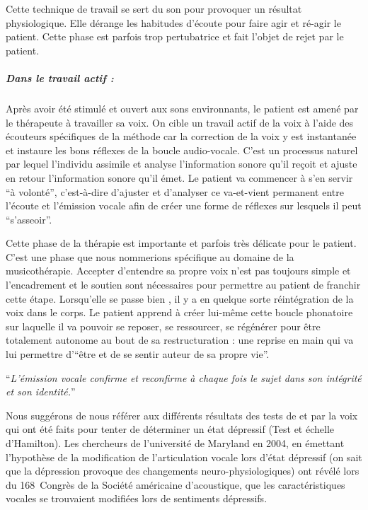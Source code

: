 Cette technique de travail se sert du son pour provoquer un résultat
physiologique. Elle dérange les habitudes d'écoute pour faire agir
et ré-agir le patient. Cette phase est parfois trop pertubatrice et fait l'objet de rejet 
par le patient.

\subparagraph{Dans le travail actif :}

Après avoir été stimulé et ouvert aux sons environnants, le patient
est amené par le thérapeute à travailler sa voix. On cible un travail
actif de la voix à l'aide des écouteurs spécifiques de la méthode
car la correction de la voix y est instantanée et instaure les bons
réflexes de la boucle audio-vocale. C'est un processus naturel par
lequel l'individu assimile et analyse l'information sonore qu'il reçoit
et ajuste en retour l'information sonore qu'il émet. Le patient va
commencer à s'en servir ``à volonté'', c'est-à-dire d'ajuster et
d'analyser ce va-et-vient permanent entre l'écoute et l'émission vocale
afin de créer une forme de réflexes sur lesquels il peut ``s'asseoir''. 

Cette phase de la thérapie est importante et parfois très délicate
pour le patient. C'est une phase que nous nommerions spécifique au domaine de la musicothérapie.  Accepter d'entendre sa propre voix n'est pas toujours
simple et l'encadrement et le soutien sont nécessaires pour permettre
au patient de franchir cette étape. Lorsqu'elle se passe bien , il
y a en quelque sorte réintégration de la voix dans le corps. Le patient
apprend à créer lui-même cette boucle phonatoire sur laquelle il va
pouvoir se reposer, se ressourcer, se régénérer pour être totalement
autonome au bout de sa restructuration : une reprise en main qui va
lui permettre d'``être et de se sentir auteur de sa propre vie''. 

\enquote{\emph{L'émission vocale confirme et reconfirme à chaque
fois le sujet dans son intégrité et son identité.}}%
\autocite[Tomatis en fait une description précise dans la troisième partie de
son livre, pp. 185--301]{tomatis:loreille}


Nous suggérons de nous référer aux différents résultats des tests de et par la voix
qui ont été faits pour tenter de déterminer un état dépressif 
(Test et échelle d'Hamilton). Les chercheurs de l'université de Maryland en 2004,
en émettant l'hypothèse de la modification de l'articulation vocale 
lors d'état dépressif (on sait que la dépression provoque des changements  
neuro-physiologiques) ont révélé lors du 168\ieme\ Congrès de la Société
américaine d'acoustique, que les caractéristiques 
vocales se trouvaient modifiées lors de sentiments 
dépressifs\autocite{le_service_metronews}.


